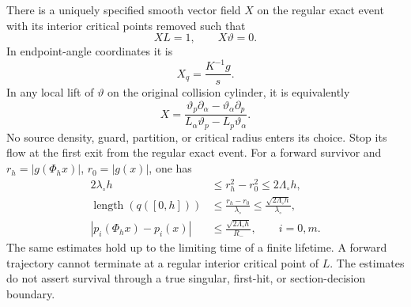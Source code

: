 \begin{theorem}
\label{thm:v77-field}
There is a uniquely specified smooth vector field $X$ on the regular
exact event with its interior critical points removed such that
\begin{equation}\label{eq:v77-field-defining}
                          XL=1,\qquad X\vartheta=0.
\end{equation}
In endpoint-angle coordinates it is
\begin{equation}\label{eq:v77-newton-field}
                              X_q=\frac{K^{-1}g}{s}.
\end{equation}
In any local lift of $\vartheta$ on the original collision cylinder,
it is equivalently
\[
 X=\frac{\vartheta_p\partial_\alpha-
                   \vartheta_\alpha\partial_p}
          {L_\alpha\vartheta_p-L_p\vartheta_\alpha}.
\]
No source density, guard, partition, or critical radius enters its
choice. Stop its flow at the first exit from the regular exact event.
For a forward survivor and $r_h=|g(\Phi_hx)|$, $r_0=|g(x)|$, one has
\begin{align}
 2\lambda_\circ h&\le r_h^2-r_0^2\le2\Lambda_\circ h,
                                      \label{eq:v77-radial-speed}\\
 \operatorname{length}(q([0,h]))
       &\le\frac{r_h-r_0}{\lambda_\circ}
        \le\frac{\sqrt{2\Lambda_\circ h}}{\lambda_\circ},
                                      \label{eq:v77-endpoint-motion}\\
 |p_i(\Phi_hx)-p_i(x)|&\le
       \frac{\sqrt{2\Lambda_\circ h}}{R_-},\qquad i=0,m.
                                      \label{eq:v77-momentum-motion}
\end{align}
The same estimates hold up to the limiting time of a finite lifetime.
A forward trajectory cannot terminate at a regular interior critical
point of $L$. The estimates do not assert survival through a true
singular, first-hit, or section-decision boundary.
\end{theorem}
